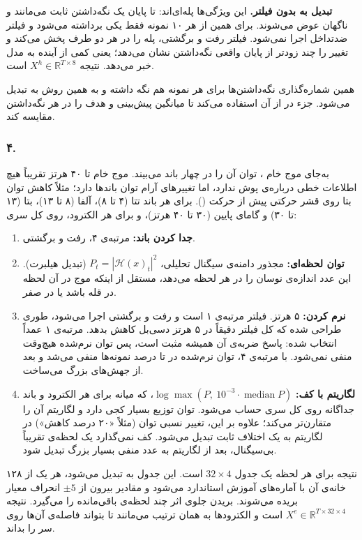 \textbf{تبدیل به  بدون فیلتر.} این ویژگی‌ها پله‌ای‌اند: تا پایان یک نگه‌داشتن ثابت می‌مانند و ناگهان عوض می‌شوند. برای همین از هر ۱۰ نمونه فقط یکی برداشته می‌شود و فیلتر ضدتداخل اجرا نمی‌شود. فیلتر رفت و برگشتی، پله را در هر دو طرف پخش می‌کند و تغییر را چند  زودتر از پایان واقعی نگه‌داشتن نشان می‌دهد؛ یعنی کمی از آینده به مدل خبر می‌دهد. نتیجه $X^{h}\in\mathbb{R}^{T\times8}$ است.

همین شماره‌گذاری نگه‌داشتن‌ها برای هر نمونه هم نگه داشته و به همین روش به  تبدیل می‌شود. جزء  در  از آن استفاده می‌کند تا میانگین پیش‌بینی و هدف را در هر نگه‌داشتن مقایسه کند.

\subsubsection*{۴.  }
 به‌جای موج خام ، توان آن را در چهار باند می‌بیند. موج خام  تا ۴۰ هرتز تقریباً هیچ اطلاعات خطی درباره‌ی پوش  ندارد، اما تغییرهای آرام توان باندها دارد؛ مثلاً کاهش توان بتا روی قشر حرکتی پیش از حرکت (). برای هر باند تتا (۴ تا ۸)، آلفا (۸ تا ۱۳)، بتا (۱۳ تا ۳۰) و گامای پایین (۳۰ تا ۴۰ هرتز)، و برای هر الکترود، روی کل سری:
\begin{enumerate}
\item \textbf{جدا کردن باند:}   مرتبه‌ی ۴، رفت و برگشتی.
\item \textbf{توان لحظه‌ای:} مجذور دامنه‌ی سیگنال تحلیلی، $P_t=|\mathcal{H}(x)_t|^2$ (تبدیل هیلبرت). این عدد اندازه‌ی نوسان را در هر لحظه می‌دهد، مستقل از اینکه موج در آن لحظه در قله باشد یا در صفر.
\item \textbf{نرم کردن:}  ۵ هرتز. فیلتر مرتبه‌ی ۱ است و رفت و برگشتی اجرا می‌شود، طوری طراحی شده که کل فیلتر دقیقاً در ۵ هرتز  دسی‌بل کاهش بدهد. مرتبه‌ی ۱ عمداً انتخاب شده: پاسخ ضربه‌ی آن همیشه مثبت است، پس توان نرم‌شده هیچ‌وقت منفی نمی‌شود. با مرتبه‌ی ۴، توان نرم‌شده در  تا  درصد نمونه‌ها منفی می‌شد و بعد از  جهش‌های بزرگ می‌ساخت.
\item \textbf{لگاریتم با کف:} $\log\max(P,\ 10^{-3}\cdot\operatorname{median}P)$، که میانه برای هر الکترود و باند جداگانه روی کل سری حساب می‌شود. توان توزیع بسیار کجی دارد و لگاریتم آن را متقارن‌تر می‌کند؛ علاوه بر این، تغییر نسبی توان (مثلاً «۲۰ درصد کاهش») در لگاریتم به یک اختلاف ثابت تبدیل می‌شود. کف نمی‌گذارد یک لحظه‌ی تقریباً بی‌سیگنال، بعد از لگاریتم به عدد منفی بسیار بزرگ تبدیل شود.
\end{enumerate}
نتیجه برای هر لحظه یک جدول $32\times4$ است. این جدول به  تبدیل می‌شود، هر یک از ۱۲۸ خانه‌ی آن با آماره‌های  آموزش استاندارد می‌شود و مقادیر بیرون از $\pm5$ انحراف معیار بریده می‌شوند. بریدن جلوی اثر چند لحظه‌ی  باقی‌مانده را می‌گیرد. نتیجه $X^{e}\in\mathbb{R}^{T\times32\times4}$ است و الکترودها به همان ترتیب  می‌مانند تا  بتواند فاصله‌ی آن‌ها روی سر را بداند.

